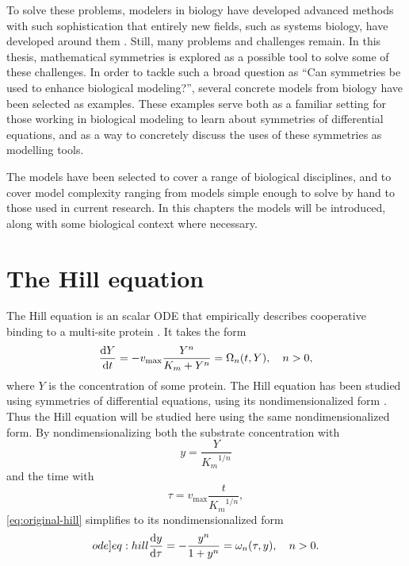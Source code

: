 To solve these problems, modelers in biology have developed advanced methods with such sophistication that entirely new fields, such as systems biology, have developed around them \cite{kitano2002systems,westerhoff2004evolution}.
Still, many problems and challenges remain.
In this thesis, mathematical symmetries is explored as a possible tool to solve some of these challenges.
In order to tackle such a broad question as \enquote{Can symmetries be used to enhance biological modeling?}, several concrete models from biology have been selected as examples.
These examples serve both as a familiar setting for those working in biological modeling to learn about symmetries of differential equations, and as a way to concretely discuss the uses of these symmetries as modelling tools.

The models have been selected to cover a range of biological disciplines, and to cover model complexity ranging from models simple enough to solve by hand to those used in current research.
In this chapters the models will be introduced, along with some biological context where necessary.

\section{The Hill equation}

The Hill equation is an scalar ODE that empirically describes cooperative binding to a multi-site protein \cite{weiss1997hill}.
It takes the form
\begin{equation} \label{eq:original-hill}
  \diff{Y}{t} = - v_\text{max} \frac{Y^n}{K_m + Y^n} = \Omega_n(t, Y), \quad
  n > 0,
\end{equation}
where \(Y\) is the concentration of some protein.
The Hill equation has been studied using symmetries of differential equations, using its nondimensionalized form \cite{ohlsson2020symmetry}.
Thus the Hill equation will be studied here using the same nondimensionalized form.
By nondimensionalizing both the substrate concentration with
\begin{equation}
  y = \frac{Y}{{K_m}^{1/n}}
\end{equation}
and the time with
\begin{equation}
  \tau = v_\text{max} \frac{t}{{K_m}^{1/n}},
\end{equation}
\cref{eq:original-hill} simplifies to its nondimensionalized form
\begin{equation} \label[ode]{eq:hill}
  \diff{y}{\tau} = - \frac{y^n}{1 + y^n} = \omega_n(\tau, y), \quad
  n > 0.
\end{equation}

